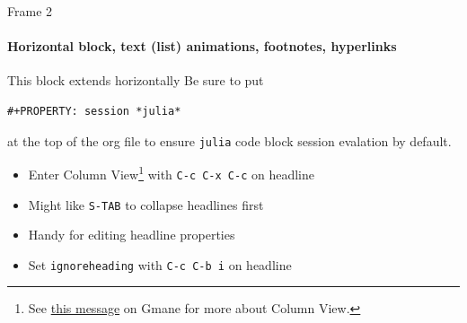 \documentclass[presentation]{beamer}
\begin{document}
\begin{frame}[fragile,label=sec-1-2]{Frame 2}
 \framesubtitle{Horizontal block, text (list) animations, footnotes, hyperlinks}

\begin{block}{This block extends horizontally}
Be sure to put 

\begin{verbatim}
#+PROPERTY: session *julia*
\end{verbatim}

at the top of the org file to ensure \texttt{julia} code block session evalation by default.
\end{block}
\begin{itemize}[<+->]
\item Enter Column View\footnote{See \href{http://thread.gmane.org/gmane.emacs.orgmode/5107/focus=5134}{this message} on Gmane for more about Column View.} with \texttt{C-c C-x C-c} on headline
\item Might like \texttt{S-TAB} to collapse headlines first
\item Handy for editing headline properties
\item Set \texttt{ignoreheading} with \texttt{C-c C-b i} on headline
\end{itemize}
\end{frame}
\end{document}
